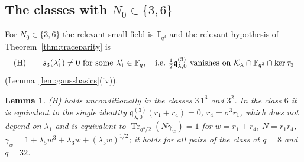 \documentclass[12pt,a4paper]{amsart}
\newtheorem{lemma}[theorem]{Lemma}
\theoremstyle{definition}
\newcommand{\F}{\mathbb{F}}
\newcommand{\Tr}{\operatorname{Tr}}
\newcommand{\Kk}{\mathcal{K}}
\newcommand{\qq}{\mathfrak{q}}
\begin{document}
\subsection{The classes with \texorpdfstring{$N_0\in\{3,6\}$}{N0 in \{3,6\}}}\label{subsec:N0div6}
For $N_0\in\{3,6\}$ the relevant small field is $\F_{q^3}$ and the relevant hypothesis of Theorem~\ref{thm:traceparity} is
\begin{equation}\label{eq:H}
\textup{(H)}\qquad s_3(\lambda_1')\ne0\ \text{for some }\lambda_1'\in\F_q,\quad\text{i.e.\ }\tfrac12\qq^{(3)}_{\lambda,0}\ \text{vanishes on }\Kk_\lambda\cap\F_{q^3}\cap\ker\tau_3
\end{equation}
(Lemma~\ref{lem:gaussbasics}(iv)).

\begin{lemma}\label{lem:Hcheck}
\textup{(H)} holds unconditionally in the classes $3\,1^3$ and $3^2$. In the class $6$ it is equivalent to the single identity $\qq^{(3)}_{\lambda,0}(r_1+r_4)=0$, $r_4=\sigma^3r_1$, which does not depend on $\lambda_1$ and is equivalent to $\Tr_{q^3/2}(N\gamma_w)=1$ for $w=r_1+r_4$, $N=r_1r_4$, $\gamma_w=1+\lambda_5w^3+\lambda_3w+(\lambda_5w)^{1/2}$; it holds for all pairs of the class at $q=8$ and $q=32$.
\end{lemma}
\end{document}
